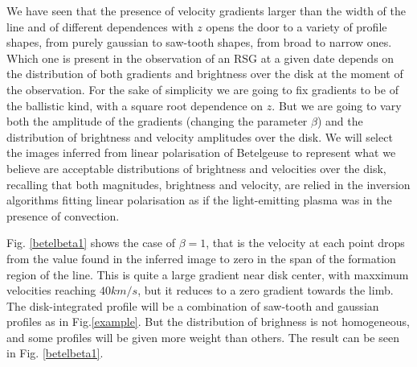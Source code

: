 \documentclass{/Users/art2/TeX/aanda/aa}
\begin{document}
We have seen that the presence of velocity gradients larger than the width of the line and of different dependences with $z$ opens the door to a 
variety of profile shapes, from purely gaussian to saw-tooth shapes, from broad to narrow ones. Which one is present in the observation 
of an RSG at a given date depends on the distribution of both gradients and brightness over the disk at the moment of the observation. 
For the sake of simplicity we are going to fix gradients to be of the ballistic kind, with a square root dependence on $z$. But we are going 
to vary both the amplitude of the gradients (changing the parameter $\beta$) and the distribution of brightness and velocity amplitudes over 
the disk. We will select the images inferred from linear polarisation of Betelgeuse to represent what we believe are acceptable 
distributions of brightness and velocities over the disk, recalling that both magnitudes, brightness and velocity, are relied in the 
inversion algorithms fitting linear polarisation as if the light-emitting plasma was in the presence of convection. 

Fig. \ref{betelbeta1} shows the case of $\beta=1$, that is the velocity at each point drops from the value found in the inferred image to zero 
in the span of the formation region of the line. This is quite a large gradient near disk center, with maxximum velocities reaching 
$40 km/s$, but it reduces to a zero gradient towards the limb. The disk-integrated profile will be a combination of saw-tooth and gaussian 
profiles as in Fig.\ref{example}. But the distribution of brighness is not homogeneous, and some profiles will be given more weight 
than others. The result can be seen in Fig. \ref{betelbeta1}.
\end{document}

